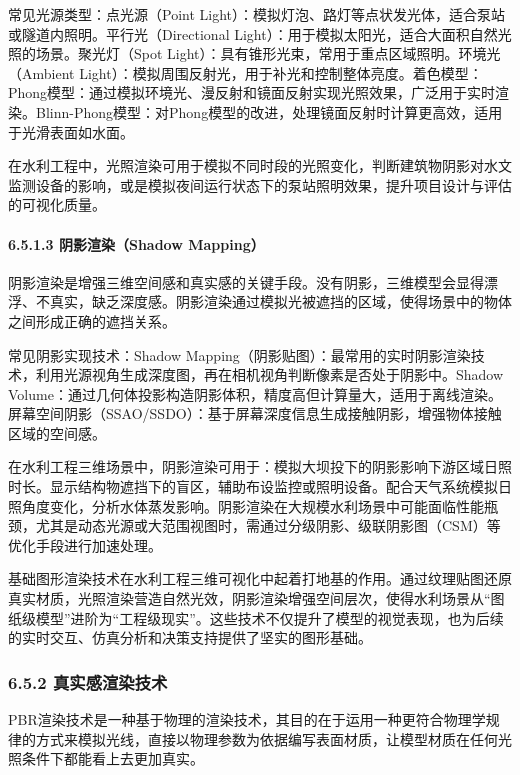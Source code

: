 常见光源类型：点光源（Point Light）：模拟灯泡、路灯等点状发光体，适合泵站或隧道内照明。平行光（Directional Light）：用于模拟太阳光，适合大面积自然光照的场景。聚光灯（Spot Light）：具有锥形光束，常用于重点区域照明。环境光（Ambient Light）：模拟周围反射光，用于补光和控制整体亮度。着色模型：Phong模型：通过模拟环境光、漫反射和镜面反射实现光照效果，广泛用于实时渲染。Blinn-Phong模型：对Phong模型的改进，处理镜面反射时计算更高效，适用于光滑表面如水面。

在水利工程中，光照渲染可用于模拟不同时段的光照变化，判断建筑物阴影对水文监测设备的影响，或是模拟夜间运行状态下的泵站照明效果，提升项目设计与评估的可视化质量。

\hypertarget{ux9634ux5f71ux6e32ux67d3shadow-mapping}{%
\paragraph{6.5.1.3 阴影渲染（Shadow Mapping）}\label{ux9634ux5f71ux6e32ux67d3shadow-mapping}}

阴影渲染是增强三维空间感和真实感的关键手段。没有阴影，三维模型会显得漂浮、不真实，缺乏深度感。阴影渲染通过模拟光被遮挡的区域，使得场景中的物体之间形成正确的遮挡关系。

常见阴影实现技术：Shadow Mapping（阴影贴图）：最常用的实时阴影渲染技术，利用光源视角生成深度图，再在相机视角判断像素是否处于阴影中。Shadow Volume：通过几何体投影构造阴影体积，精度高但计算量大，适用于离线渲染。屏幕空间阴影（SSAO/SSDO）：基于屏幕深度信息生成接触阴影，增强物体接触区域的空间感。

在水利工程三维场景中，阴影渲染可用于：模拟大坝投下的阴影影响下游区域日照时长。显示结构物遮挡下的盲区，辅助布设监控或照明设备。配合天气系统模拟日照角度变化，分析水体蒸发影响。阴影渲染在大规模水利场景中可能面临性能瓶颈，尤其是动态光源或大范围视图时，需通过分级阴影、级联阴影图（CSM）等优化手段进行加速处理。

基础图形渲染技术在水利工程三维可视化中起着打地基的作用。通过纹理贴图还原真实材质，光照渲染营造自然光效，阴影渲染增强空间层次，使得水利场景从``图纸级模型''进阶为``工程级现实''。这些技术不仅提升了模型的视觉表现，也为后续的实时交互、仿真分析和决策支持提供了坚实的图形基础。

\hypertarget{ux771fux5b9eux611fux6e32ux67d3ux6280ux672f}{%
\subsubsection{6.5.2 真实感渲染技术}\label{ux771fux5b9eux611fux6e32ux67d3ux6280ux672f}}

PBR渲染技术是一种基于物理的渲染技术，其目的在于运用一种更符合物理学规律的方式来模拟光线，直接以物理参数为依据编写表面材质，让模型材质在任何光照条件下都能看上去更加真实。

